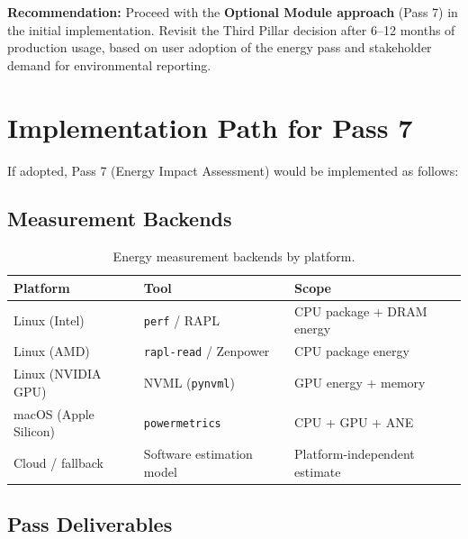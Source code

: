 \documentclass[11pt, a4paper]{article}
\begin{document}
\textbf{Recommendation:} Proceed with the \textbf{Optional Module approach}
(Pass 7) in the initial implementation. Revisit the Third Pillar decision
after 6--12 months of production usage, based on user adoption of the energy
pass and stakeholder demand for environmental reporting.

\section{Implementation Path for Pass 7}

If adopted, Pass 7 (Energy Impact Assessment) would be implemented as
follows:

\subsection*{Measurement Backends}

\begin{table}[H]
  \centering
  \caption{Energy measurement backends by platform.}
  \label{tab:energy-backends}
  \renewcommand{\arraystretch}{1.3}
  \begin{tabularx}{\textwidth}{l l Y}
    \toprule
    \textbf{Platform} & \textbf{Tool} & \textbf{Scope} \\
    \midrule
    Linux (Intel) & \texttt{perf} / RAPL & CPU package + DRAM energy \\
    Linux (AMD) & \texttt{rapl-read} / Zenpower & CPU package energy \\
    Linux (NVIDIA GPU) & NVML (\texttt{pynvml}) & GPU energy + memory \\
    macOS (Apple Silicon) & \texttt{powermetrics} & CPU + GPU + ANE \\
    Cloud / fallback & Software estimation model & Platform-independent
      estimate \\
    \bottomrule
  \end{tabularx}
\end{table}

\subsection*{Pass Deliverables}
\end{document}
